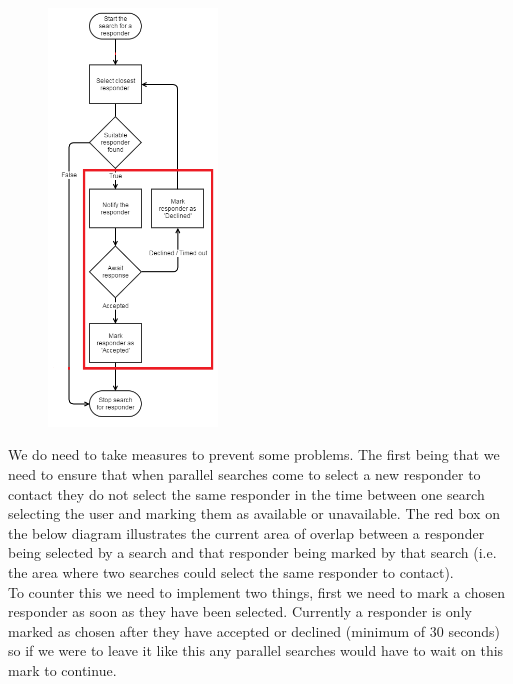 \documentclass{article}
\begin{document}
\pagebreak
\begin{figure}
  \begin{center}
    \includegraphics[width=0.4\textwidth]{"Iteration3/parallelization_of_search (3) (1)"}
  \end{center}
\end{figure}
We do need to take measures to prevent some problems. The first being that we need to ensure that when parallel searches come to select a new responder to contact they do not select the same responder in the time between one search selecting the user and marking them as available or unavailable. The red box on the below diagram illustrates the current area of overlap between a responder being selected by a search and that responder being marked by that search (i.e. the area where two searches could select the same responder to contact).\\

To counter this we need to implement two things, first we need to mark a chosen responder as soon as they have been selected. Currently a responder is only marked as chosen after they have accepted or declined (minimum of 30 seconds) so if we were to leave it like this any parallel searches would have to wait on this mark to continue.\\
\end{document}

